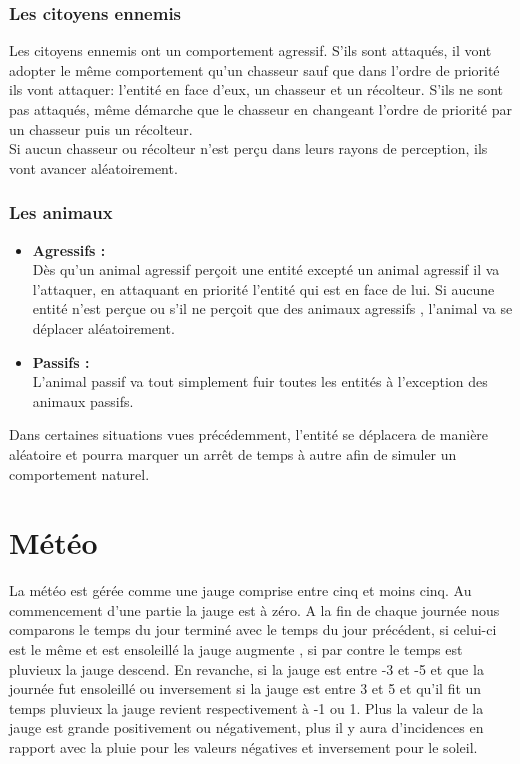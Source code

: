 \documentclass[a4paper]{article}
\newcommand{\alinea}{\hspace*{0.5cm}}
\begin{document}
		         \subsubsection{Les citoyens ennemis}
			\alinea Les citoyens ennemis ont un comportement agressif.
			S'ils sont attaqués, il vont adopter le même comportement qu'un chasseur sauf que dans l'ordre de priorité ils vont attaquer: l'entité en face d'eux, un chasseur et un récolteur.
			S'ils ne sont pas attaqués, même démarche que le chasseur en changeant l'ordre de priorité par un chasseur puis un récolteur.\\
			Si aucun chasseur ou récolteur n'est perçu dans leurs rayons de perception, ils vont avancer aléatoirement.
			
		
		      \subsubsection{Les animaux}
		         \begin{itemize} \small
		             \item \textbf{Agressifs :} \\
			    \alinea Dès qu'un animal agressif perçoit une entité excepté un animal agressif il va l'attaquer, en attaquant en priorité l'entité qui est en face 
			    de lui. Si aucune entité n'est perçue ou s'il ne perçoit que des animaux agressifs , l'animal va se déplacer aléatoirement.
		             \item \textbf{Passifs :} \\
			    \alinea L'animal passif va tout simplement fuir toutes les entités à l'exception des animaux passifs.
		        \end{itemize} \normalsize 


Dans certaines situations vues précédemment, l’entité se déplacera de manière aléatoire et pourra marquer un arrêt de temps à autre afin de simuler un comportement naturel.
	
	\section{Météo}
	La météo est gérée comme une jauge comprise entre cinq et moins cinq. Au commencement d'une partie la jauge est à zéro.
	A la fin de chaque journée nous comparons le temps du jour terminé avec le temps du jour précédent, si celui-ci est le même  et est  ensoleillé la jauge augmente , si par contre le temps est pluvieux la jauge descend.
	En revanche, si la jauge est  entre -3 et -5 et que la journée fut ensoleillé ou inversement si la jauge est entre 3 et 5 et qu'il fit un temps pluvieux la jauge revient respectivement à -1 ou 1.
	Plus la valeur de la jauge est grande positivement ou négativement, plus il y aura d'incidences en rapport avec la pluie pour les valeurs négatives et inversement pour le soleil.
	
\end{document}
